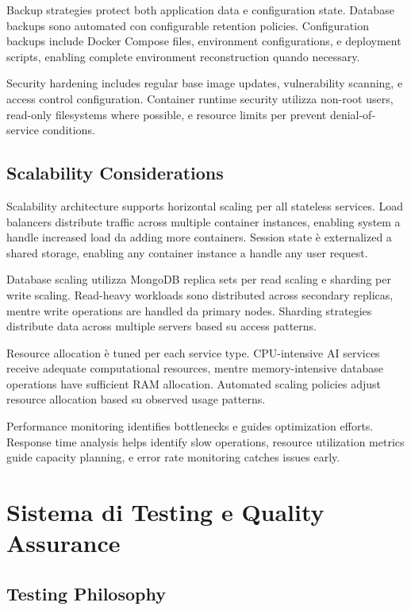 \documentclass[12pt,a4paper]{article}
\begin{document}
Backup strategies protect both application data e configuration state. Database backups sono automated con configurable retention policies. Configuration backups include Docker Compose files, environment configurations, e deployment scripts, enabling complete environment reconstruction quando necessary.

Security hardening includes regular base image updates, vulnerability scanning, e access control configuration. Container runtime security utilizza non-root users, read-only filesystems where possible, e resource limits per prevent denial-of-service conditions.

\subsection{Scalability Considerations}

Scalability architecture supports horizontal scaling per all stateless services. Load balancers distribute traffic across multiple container instances, enabling system a handle increased load da adding more containers. Session state è externalized a shared storage, enabling any container instance a handle any user request.

Database scaling utilizza MongoDB replica sets per read scaling e sharding per write scaling. Read-heavy workloads sono distributed across secondary replicas, mentre write operations are handled da primary nodes. Sharding strategies distribute data across multiple servers based su access patterns.

Resource allocation è tuned per each service type. CPU-intensive AI services receive adequate computational resources, mentre memory-intensive database operations have sufficient RAM allocation. Automated scaling policies adjust resource allocation based su observed usage patterns.

Performance monitoring identifies bottlenecks e guides optimization efforts. Response time analysis helps identify slow operations, resource utilization metrics guide capacity planning, e error rate monitoring catches issues early.

\section{Sistema di Testing e Quality Assurance}

\subsection{Testing Philosophy}
\end{document}
